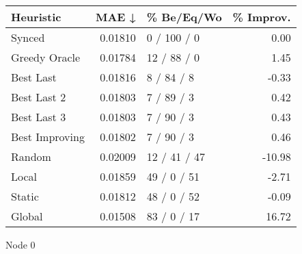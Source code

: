 \begin{tabular}{lrlr}
\toprule
\textbf{Heuristic} & \textbf{MAE ↓} & \textbf{\% Be/Eq/Wo} & \textbf{\% Improv.} \\
\midrule
            Synced &        0.01810 &          0 / 100 / 0 &                0.00 \\
     Greedy Oracle &        0.01784 &          12 / 88 / 0 &                1.45 \\
         Best Last &        0.01816 &           8 / 84 / 8 &               -0.33 \\
       Best Last 2 &        0.01803 &           7 / 89 / 3 &                0.42 \\
       Best Last 3 &        0.01803 &           7 / 90 / 3 &                0.43 \\
    Best Improving &        0.01802 &           7 / 90 / 3 &                0.46 \\
            Random &        0.02009 &         12 / 41 / 47 &              -10.98 \\
             Local &        0.01859 &          49 / 0 / 51 &               -2.71 \\
            Static &        0.01812 &          48 / 0 / 52 &               -0.09 \\
            Global &        0.01508 &          83 / 0 / 17 &               16.72 \\
\bottomrule
\end{tabular}
\caption{Node 0}
\label{tab:non_lr05_le1_bs4_0}
